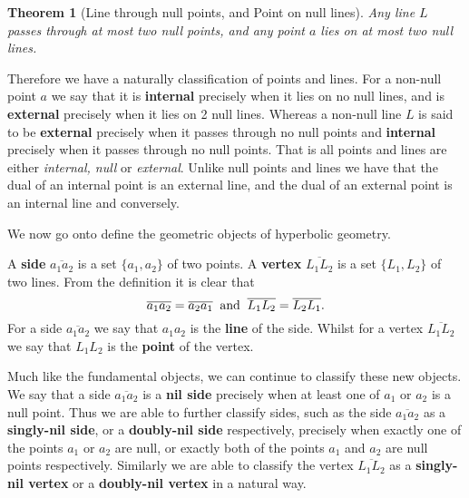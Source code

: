\documentclass{unswthesis}
\newtheorem{theorem}{Theorem}
\begin{document}
\begin{theorem}[Line through null points, and Point on null lines]
Any line $L$ passes through at most two null points, and any point $a$ lies
on at most two null lines.
\end{theorem}

Therefore we have a naturally classification of points and lines. For a
non-null point $a$ we say that it is \textbf{internal} precisely when it
lies on no null lines, and is \textbf{external} precisely when it lies on 2
null lines. Whereas a non-null line $L$ is said to be \textbf{external}
precisely when it passes through no null points and \textbf{internal}
precisely when it passes through no null points. That is all points and
lines are either \textit{internal, null} or \textit{external}.\newline
Unlike null points and lines we have that the dual of an internal point is
an external line, and the dual of an external point is an internal line and
conversely.

\pagebreak

We now go onto define the geometric objects of hyperbolic geometry.\newline

A \textbf{side} $\overline{a_{1}a_{2}}$ is a set $\{a_{1},a_{2}\}$ of two
points. A \textbf{vertex} $\overline{L_{1}L_{2}}$ is a set $\{L_{1},L_{2}\}$
of two lines. From the definition it is clear that 
\begin{equation*}
\overline{a_{1}a_{2}}=\overline{a_{2}a_{1}}\;\; \text{and}\;\;\overline{%
L_{1}L_{2}}=\overline{L_{2}L_{1}}. 
\end{equation*}
For a side $\overline{a_{1}a_{2}}$ we say that $a_{1}a_{2}$ is the \textbf{%
line} of the side. Whilst for a vertex $\overline{L_{1}L_{2}}$ we say that $%
L_{1}L_{2}$ is the \textbf{point} of the vertex.\newline

Much like the fundamental objects, we can continue to classify these new
objects. We say that a side $\overline{a_{1}a_{2}}$ is a \textbf{nil side}
precisely when at least one of $a_{1}$ or $a_{2}$ is a null point. Thus we
are able to further classify sides, such as the side $\overline{a_{1}a_{2}}$
as a \textbf{singly-nil side}, or a \textbf{doubly-nil side} respectively,
precisely when exactly one of the points $a_{1}$ or $a_{2}$ are null, or
exactly both of the points $a_{1}$ and $a_{2}$ are null points respectively.
Similarly we are able to classify the vertex $\overline{L_{1}L_{2}}$ as a 
\textbf{singly-nil vertex} or a \textbf{doubly-nil vertex} in a natural way.%
\newline
\end{document}
